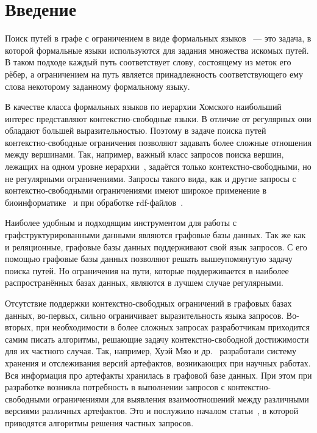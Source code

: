 \section*{Введение}
Поиск путей в графе с ограничением в виде формальных языков~\cite{FLCpathProblem} --- это задача, в которой формальные языки используются для задания множества искомых путей. В таком подходе каждый путь соответствует слову, состоящему из меток его рёбер, а ограничением на путь является принадлежность соответствующего ему слова некоторому заданному формальному языку.

В качестве класса формальных языков по иерархии Хомского наибольший интерес представляют контекстно-свободные языки. В отличие от регулярных они обладают большей выразительностью. Поэтому в задаче поиска путей контекстно-свободные ограничения позволяют задавать более сложные отношения между вершинами. Так, например, важный класс запросов поиска вершин, лежащих на одном уровне иерархии~\cite{zhlang-2016}, задаётся только контекстно-свободными, но не регулярными ограничениями. Запросы такого вида, как и другие запросы с контекстно-свободными ограничениями имеют широкое применение в биоинформатике~\cite{bio-application} и при обработке rdf-файлов~\cite{zhlang-2016}.

Наиболее удобным и подходящим инструментом для работы с граф\-структурированными данными являются графовые базы данных. Так же как и реляционные, графовые базы данных поддерживают свой язык запросов. С его помощью графовые базы данных позволяют решать вышеупомянутую задачу поиска путей. Но ограничения на пути, которые поддерживается в наиболее распространённых базах данных, являются в лучшем случае регулярными.

Отсутствие поддержки контекстно-свободных ограничений в графовых базах данных, во-первых, сильно ограничивает выразительность языка запросов. Во-вторых, при необходимости в более сложных запросах разработчикам приходится самим писать алгоритмы, решающие задачу контекстно-свободной достижимости для их частного случая. Так, например, Хуэй Мяо и др.~\cite{datascince-lifecycle} разработали систему хранения и отслеживания версий артефактов, возникающих при научных работах. Вся информация про артефакты хранилась в графовой базе данных. При этом при разработке возникла потребность в выполнении запросов с контекстно-свободными ограничениями для выявления взаимоотношений между различными версиями различных артефактов. Это и послужило началом статьи~\cite{datascince-lifecycle}, в которой приводятся алгоритмы решения частных запросов.

